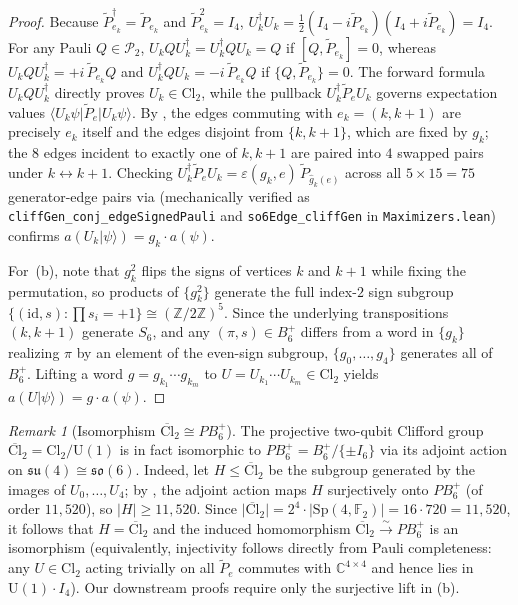 \documentclass[11pt,a4paper]{article}
\theoremstyle{plain}
\theoremstyle{definition}
\theoremstyle{remark}
\newtheorem{remark}[theorem]{Remark}
\newcommand{\C}{\mathbb{C}}
\newcommand{\Z}{\mathbb{Z}}
\newcommand{\F}{\mathbb{F}}
\newcommand{\ket}[1]{\lvert #1 \rangle}
\newcommand{\expval}[2]{\langle #1 \vert #2 \vert #1 \rangle}
\newcommand{\Sp}{\mathrm{Sp}}
\newcommand{\Cl}{\mathrm{Cl}}
\newcommand{\PCl}{\overline{\mathrm{Cl}}}
\newcommand{\Pauli}{\mathcal{P}}
\newcommand{\Bplus}{B_6^+}
\newcommand{\PBplus}{PB_6^+}
\newcommand{\code}[1]{\texttt{\small #1}}
\begin{document}
\begin{proof}
Because $\tilde{P}_{e_k}^\dagger = \tilde{P}_{e_k}$ and $\tilde{P}_{e_k}^2 = I_4$, $U_k^\dagger U_k = \frac{1}{2}(I_4 - i\tilde{P}_{e_k})(I_4 + i\tilde{P}_{e_k}) = I_4$. For any Pauli $Q \in \Pauli_2$, $U_k Q U_k^\dagger = U_k^\dagger Q U_k = Q$ if $[Q, \tilde{P}_{e_k}] = 0$, whereas $U_k Q U_k^\dagger = +i\,\tilde{P}_{e_k} Q$ and $U_k^\dagger Q U_k = -i\,\tilde{P}_{e_k} Q$ if $\{Q, \tilde{P}_{e_k}\} = 0$. The forward formula $U_k Q U_k^\dagger$ directly proves $U_k \in \Cl_2$, while the pullback $U_k^\dagger \tilde{P}_e U_k$ governs expectation values $\expval{U_k\psi}{\tilde{P}_e}$. By , the edges commuting with $e_k = (k, k+1)$ are precisely $e_k$ itself and the edges disjoint from $\{k, k+1\}$, which are fixed by $g_k$; the $8$ edges incident to exactly one of $k, k+1$ are paired into $4$ swapped pairs under $k \leftrightarrow k+1$. Checking $U_k^\dagger \tilde{P}_e U_k = \varepsilon(g_k, e)\,\tilde{P}_{\hat{g}_k(e)}$ across all $5 \times 15 = 75$ generator-edge pairs via  (mechanically verified as \code{cliffGen\_conj\_edgeSignedPauli} and \code{so6Edge\_cliffGen} in \code{Maximizers.lean}) confirms $a(U_k\ket{\psi}) = g_k \cdot a(\psi)$.

For~(b), note that $g_k^2$ flips the signs of vertices $k$ and $k+1$ while fixing the permutation, so products of $\{g_k^2\}$ generate the full index-$2$ sign subgroup $\{(\mathrm{id}, s) : \prod s_i = +1\} \cong (\Z/2\Z)^5$. Since the underlying transpositions $(k, k+1)$ generate $S_6$, and any $(\pi, s) \in \Bplus$ differs from a word in $\{g_k\}$ realizing $\pi$ by an element of the even-sign subgroup, $\{g_0, \dots, g_4\}$ generates all of $\Bplus$. Lifting a word $g = g_{k_1}\cdots g_{k_m}$ to $U = U_{k_1}\cdots U_{k_m} \in \Cl_2$ yields $a(U\ket{\psi}) = g \cdot a(\psi)$.
\end{proof}

\begin{remark}[Isomorphism $\PCl_2 \cong \PBplus$]
\label{rem:pcl2-pb6}
The projective two-qubit Clifford group $\PCl_2 = \Cl_2/\mathrm{U}(1)$ is in fact isomorphic to $\PBplus = \Bplus/\{\pm I_6\}$ via its adjoint action on $\mathfrak{su}(4)\cong\mathfrak{so}(6)$. Indeed, let $H \le \PCl_2$ be the subgroup generated by the images of $U_0,\dots,U_4$; by , the adjoint action maps $H$ surjectively onto $\PBplus$ (of order $11{,}520$), so $\lvert H\rvert \ge 11{,}520$. Since $\lvert\PCl_2\rvert = 2^4 \cdot \lvert\Sp(4,\F_2)\rvert = 16 \cdot 720 = 11{,}520$, it follows that $H = \PCl_2$ and the induced homomorphism $\PCl_2 \xrightarrow{\sim} \PBplus$ is an isomorphism (equivalently, injectivity follows directly from Pauli completeness: any $U \in \Cl_2$ acting trivially on all $\tilde{P}_e$ commutes with $\C^{4\times 4}$ and hence lies in $\mathrm{U}(1)\cdot I_4$). Our downstream proofs require only the surjective lift in (b).
\end{remark}
\end{document}
